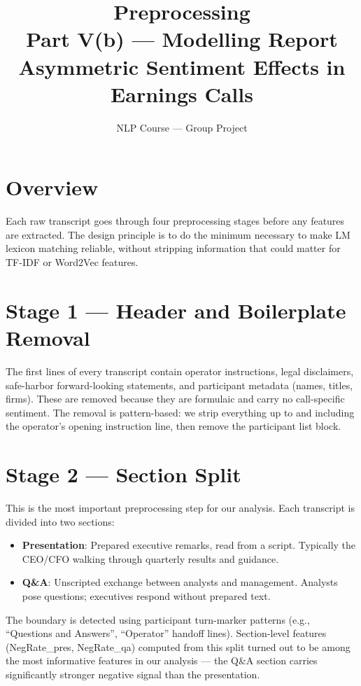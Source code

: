 \documentclass[12pt,a4paper]{article}
\title{\textbf{Preprocessing}\\[0.3em]
\large Part V(b) --- Modelling Report\\
Asymmetric Sentiment Effects in Earnings Calls}
\author{NLP Course --- Group Project}
\date{}
\begin{document}
\maketitle

\section{Overview}

Each raw transcript goes through four preprocessing stages before any features
are extracted.  The design principle is to do the minimum necessary to make
LM lexicon matching reliable, without stripping information that could matter
for TF-IDF or Word2Vec features.

\section{Stage 1 --- Header and Boilerplate Removal}

The first lines of every transcript contain operator instructions, legal disclaimers,
safe-harbor forward-looking statements, and participant metadata (names, titles, firms).
These are removed because they are formulaic and carry no call-specific sentiment.
The removal is pattern-based: we strip everything up to and including the operator's
opening instruction line, then remove the participant list block.

\section{Stage 2 --- Section Split}

This is the most important preprocessing step for our analysis.
Each transcript is divided into two sections:

\begin{itemize}
  \item \textbf{Presentation}: Prepared executive remarks, read from a script.
        Typically the CEO/CFO walking through quarterly results and guidance.
  \item \textbf{Q\&A}: Unscripted exchange between analysts and management.
        Analysts pose questions; executives respond without prepared text.
\end{itemize}

The boundary is detected using participant turn-marker patterns
(e.g., ``Questions and Answers'', ``Operator'' handoff lines).
Section-level features (NegRate\_pres, NegRate\_qa) computed from this split
turned out to be among the most informative features in our analysis ---
the Q\&A section carries significantly stronger negative signal than the presentation.
\end{document}
